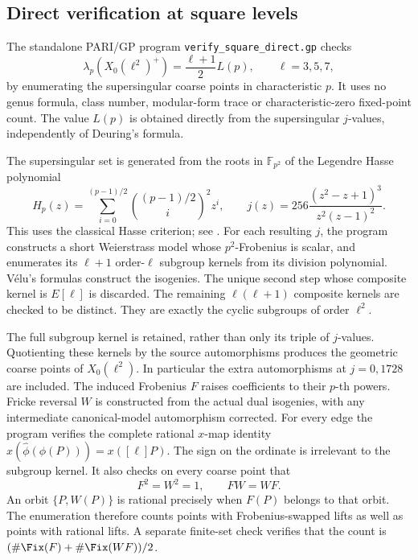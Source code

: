 \subsection{Direct verification at square levels}
\label{app:direct-square-levels}

The standalone PARI/GP program \texttt{verify\_square\_direct.gp} checks
\[
\lambda_p(X_0(\ell^2)^+)=\frac{\ell+1}{2}L(p),\qquad \ell=3,5,7,
\]
by enumerating the supersingular coarse points in characteristic $p$.
It uses no genus formula, class number, modular-form trace or
characteristic-zero fixed-point count. The value $L(p)$ is obtained directly
from the supersingular $j$-values, independently of Deuring's formula.

The supersingular set is generated from the roots in $\mathbb F_{p^2}$ of the
Legendre Hasse polynomial
\[
H_p(z)=\sum_{i=0}^{(p-1)/2}\binom{(p-1)/2}{i}^{\!2}z^i,
\qquad j(z)=256\frac{(z^2-z+1)^3}{z^2(z-1)^2}.
\]
This uses the classical Hasse criterion; see \cite[Proposition 4.19]{MMP2025}.
For each resulting $j$, the program constructs a short Weierstrass model whose
$p^2$-Frobenius is scalar, and enumerates its $\ell+1$ order-$\ell$ subgroup
kernels from its division polynomial. V\'elu's formulas construct the isogenies.
The unique second step whose composite kernel is $E[\ell]$ is discarded.
The remaining $\ell(\ell+1)$ composite kernels are checked to be distinct.
They are exactly the cyclic subgroups of order $\ell^2$.

The full subgroup kernel is retained, rather than only its triple of
$j$-values. Quotienting these kernels by the source automorphisms produces the
geometric coarse points of $X_0(\ell^2)$. In particular the extra automorphisms
at $j=0,1728$ are included. The induced Frobenius $F$ raises coefficients to
their $p$-th powers. Fricke reversal $W$ is constructed from the actual dual
isogenies, with any intermediate canonical-model automorphism corrected.
For every edge the program verifies the complete rational $x$-map identity
$x(\widehat\phi(\phi(P)))=x([\ell]P)$. The sign on the ordinate is irrelevant
to the subgroup kernel. It also checks on every coarse point that
\[
F^2=W^2=1,\qquad FW=WF.
\]
An orbit $\{P,W(P)\}$ is rational precisely when $F(P)$ belongs to that orbit.
The enumeration therefore counts points with Frobenius-swapped lifts as well
as points with rational lifts. A separate finite-set check verifies that the
count is $(\#\Fix(F)+\#\Fix(WF))/2$.


